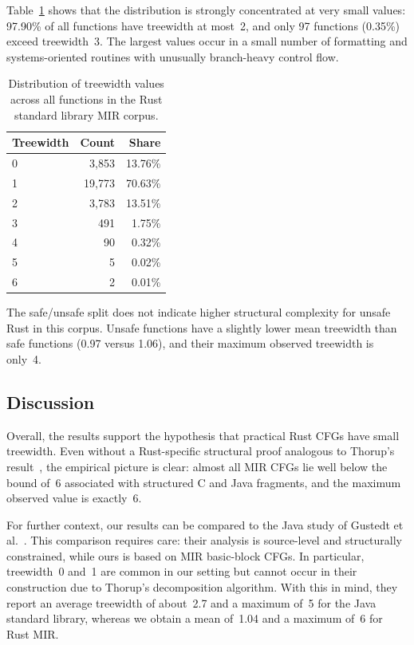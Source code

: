 \noindent Table~\ref{tab:evaluation-distribution} shows that the distribution is strongly concentrated at very small values: 97.90\% of all functions have treewidth at most~2, and only 97 functions (0.35\%) exceed treewidth~3. The largest values occur in a small number of formatting and systems-oriented routines with unusually branch-heavy control flow.
\begin{table}[h]
	\centering
	\begin{tabular}{lrr}
		\hline
		Treewidth & Count  & Share \\
		\hline
		0         & 3{,}853 & 13.76\% \\
		1         & 19{,}773 & 70.63\% \\
		2         & 3{,}783 & 13.51\% \\
		3         & 491    & 1.75\% \\
		4         & 90     & 0.32\% \\
		5         & 5      & 0.02\% \\
		6         & 2      & 0.01\% \\
		\hline
	\end{tabular}
    \caption{Distribution of treewidth values across all functions in the Rust standard library
   MIR corpus.}
    \label{tab:evaluation-distribution}
\end{table}

The safe/unsafe split does not indicate higher structural complexity for unsafe Rust in this corpus. Unsafe functions have a slightly lower mean treewidth than safe functions (0.97 versus 1.06), and their maximum observed treewidth is only~4.

\subsection{Discussion}
\label{subsec:discussion}

Overall, the results support the hypothesis that practical Rust CFGs have small treewidth. Even without a Rust-specific structural proof analogous to Thorup's result~\cite{thorup_1998}, the empirical picture is clear: almost all MIR CFGs lie well below the bound of~6 associated with structured C and Java fragments, and the maximum observed value is exactly~6.

For further context, our results can be compared to the Java study of Gustedt et al.~\cite{gustedt_2002}.
This comparison requires care: their analysis is source-level and structurally constrained, while ours is based on MIR basic-block CFGs.
In particular, treewidth~0 and~1 are common in our setting but cannot occur in their construction due to Thorup's decomposition algorithm.
With this in mind, they report an average treewidth of about~2.7 and a maximum of~5 for the Java standard library, whereas we obtain a mean of~1.04 and a maximum of~6 for Rust MIR.

